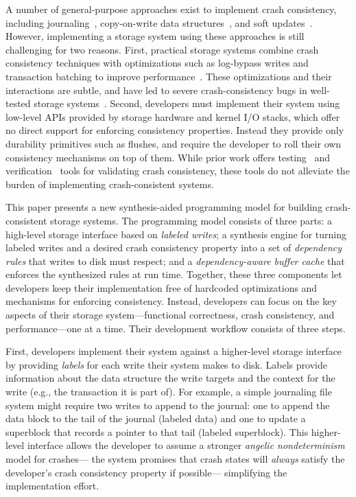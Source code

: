 A number of general-purpose approaches exist to implement crash consistency,
including journaling~\cite{prabhakaran:journaling},
copy-on-write data structures~\cite{rodeh:btrfs},
and soft updates~\cite{ganger:soft-updates}.
However, implementing a storage system using these approaches is still challenging for two reasons.
First, practical storage systems combine crash consistency techniques
with optimizations such as log-bypass writes and transaction batching to improve performance~\cite{tweedie:ext2journal}.
These optimizations and their interactions are subtle,
and have led to severe crash-consistency bugs
in well-tested storage systems~\cite{lu:fsstudy,chen:dfscq}.
Second, developers must implement their system 
using low-level APIs provided by storage hardware and kernel I/O stacks,
which offer no direct support for enforcing consistency properties.
Instead they provide only durability primitives such as flushes,
and require the developer to roll their own consistency mechanisms on top of them.
While prior work offers testing~\cite{mohan:crashmonkey,yang:explode}
and verification~\cite{chen:fscq,sigurbjarnarson:yggdrasil} tools for validating crash consistency,
these tools do not alleviate the burden of implementing crash-consistent systems.

This paper presents a new synthesis-aided programming model for building crash-consistent storage systems.
The programming model consists of three parts: 
%
a high-level storage interface based on \emph{labeled writes};
%
a synthesis engine for turning labeled writes and a desired crash consistency property 
into a set of \emph{dependency rules} that writes to disk must respect; and 
%
a \emph{dependency-aware buffer cache} that enforces the synthesized rules at run time.
%
Together, these three components let developers keep their implementation free of 
hardcoded optimizations and mechanisms for enforcing consistency. 
%
Instead, developers can focus on the key aspects of their storage system---functional 
correctness, crash consistency, and performance---one at a time. 
%
Their development workflow consists of three steps.

First, developers implement their system against a higher-level storage interface
by providing \emph{labels} for each write their system makes to disk.
Labels provide information about the data structure the write targets
and the context for the write (e.g., the transaction it is part of).
For example, a simple journaling file system might require two writes to append to the journal:
one to append the data block to the tail of the journal (labeled \textsf{data})
and one to update a superblock that records a pointer to that tail (labeled \textsf{superblock}).
This higher-level interface allows the developer to assume a stronger
\emph{angelic nondeterminism} model for crashes---%
the system promises that crash states will \emph{always} satisfy
the developer's crash consistency property if possible---%
simplifying the implementation effort.\tighten

